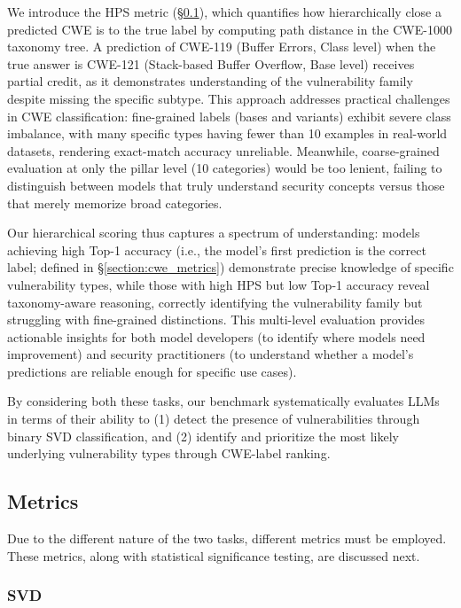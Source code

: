 \documentclass[lettersize,journal]{IEEEtran}
\begin{document}
We introduce the \gls{HPS} metric (\S\ref{section:metrics}), which quantifies how hierarchically close a predicted \gls{CWE} is to the true label by computing path distance in the CWE-1000 taxonomy tree.
A prediction of CWE-119 (Buffer Errors, Class level) when the true answer is CWE-121 (Stack-based Buffer Overflow, Base level) receives partial credit, as it demonstrates understanding of the vulnerability family despite missing the specific subtype.
This approach addresses practical challenges in \gls{CWE} classification: fine-grained labels (bases and variants) exhibit severe class imbalance, with many specific types having fewer than 10 examples in real-world datasets, rendering exact-match accuracy unreliable.
Meanwhile, coarse-grained evaluation at only the pillar level (10 categories) would be too lenient, failing to distinguish between models that truly understand security concepts versus those that merely memorize broad categories.

Our hierarchical scoring thus captures a spectrum of understanding: models achieving high Top-1 accuracy (i.e., the model's first prediction is the correct label; defined in \S\ref{section:cwe_metrics}) demonstrate precise knowledge of specific vulnerability types, while those with high \gls{HPS} but low Top-1 accuracy reveal taxonomy-aware reasoning, correctly identifying the vulnerability family but struggling with fine-grained distinctions.
This multi-level evaluation provides actionable insights for both model developers (to identify where models need improvement) and security practitioners (to understand whether a model's predictions are reliable enough for specific use cases).

By considering both these tasks, our benchmark systematically evaluates \glspl{LLM} in terms of their ability to (1) detect the presence of vulnerabilities through binary \gls{SVD} classification, and (2) identify and prioritize the most likely underlying vulnerability types through \gls{CWE}-label ranking.

\subsection{Metrics}
\label{section:metrics}

Due to the different nature of the two tasks, different metrics must be employed. These metrics, along with statistical significance testing, are discussed next. 

\subsubsection{SVD}
\end{document}
